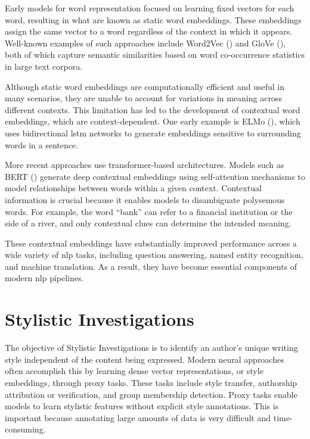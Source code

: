 Early models for word representation focused on learning fixed vectors for each word, resulting in what are known as static word embeddings. These embeddings assign the same vector to a word regardless of the context in which it appears. Well-known examples of such approaches include Word2Vec (\cite{mikolovEfficientEstimationWord2013}) and GloVe (\cite{penningtonGloveGlobalVectors2014}), both of which capture semantic similarities based on word co-occurrence statistics in large text corpora.

Although static word embeddings are computationally efficient and useful in many scenarios, they are unable to account for variations in meaning across different contexts. This limitation has led to the development of contextual word embeddings, which are context-dependent. One early example is ELMo (\cite{petersDeepContextualizedWord2018}), which uses bidirectional \ac{lstm} networks to generate embeddings sensitive to surrounding words in a sentence.

More recent approaches use transformer-based architectures. Models such as BERT (\cite{devlin-etal-2019-bert}) generate deep contextual embeddings using self-attention mechanisms to model relationships between words within a given context. Contextual information is crucial because it enables models to disambiguate polysemous words. For example, the word \enquote{bank} can refer to a financial institution or the side of a river, and only contextual clues can determine the intended meaning.

These contextual embeddings have substantially improved performance across a wide variety of \ac{nlp} tasks, including question answering, named entity recognition, and machine translation. As a result, they have become essential components of modern \ac{nlp} pipelines.

\section{Stylistic Investigations}
\label{sec:background:styleInvestigations}
The objective of Stylistic Investigations is to identify an author's unique writing style independent of the content being expressed. Modern neural approaches often accomplish this by learning dense vector representations, or style embeddings, through proxy tasks. These tasks include style transfer, authorship attribution or verification, and group membership detection. Proxy tasks enable models to learn stylistic features without explicit style annotations. This is important because annotating large amounts of data is very difficult and time-consuming.

